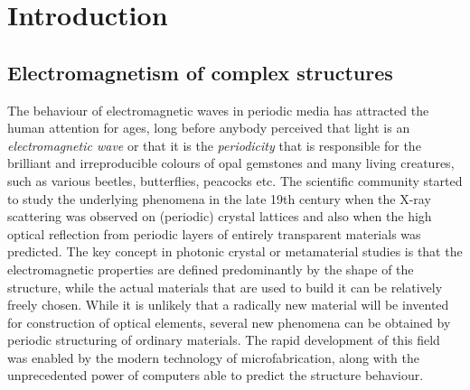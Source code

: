 \section{Introduction} %

\subsection{Electromagnetism of complex structures} %
The behaviour of electromagnetic waves in periodic media has attracted the human attention for ages, long before anybody perceived that light is an \textit{electromagnetic wave} or that it is the \textit{periodicity} that is responsible for the brilliant and irreproducible colours of opal gemstones and many living creatures, such as various beetles, butterflies, peacocks etc. 
The scientific community started to study the underlying phenomena in the late 19th century when the X-ray scattering was observed on (periodic) crystal lattices and also when the high optical reflection from periodic layers of entirely transparent materials was predicted. %
The key concept in photonic crystal or metamaterial studies is that the electromagnetic properties are defined predominantly by the shape of the structure, while the actual materials that are used to build it can be relatively freely chosen. %
While it is unlikely that a radically new material will be invented for construction of optical elements, several new phenomena can be obtained by periodic structuring of ordinary materials. The rapid development of this field was enabled by the modern technology of microfabrication, along with the unprecedented power of computers able to predict the structure behaviour.

